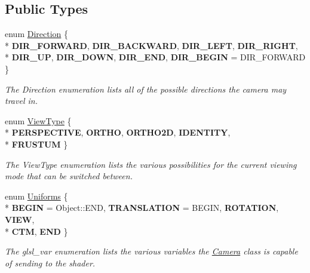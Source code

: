 \subsection*{Public Types}
\begin{DoxyCompactItemize}
\item 
enum \hyperlink{class_camera_a80cb65605322d27ad3b6d973484509ec}{Direction} \{ \\*
{\bfseries D\-I\-R\-\_\-\-F\-O\-R\-W\-A\-R\-D}, 
{\bfseries D\-I\-R\-\_\-\-B\-A\-C\-K\-W\-A\-R\-D}, 
{\bfseries D\-I\-R\-\_\-\-L\-E\-F\-T}, 
{\bfseries D\-I\-R\-\_\-\-R\-I\-G\-H\-T}, 
\\*
{\bfseries D\-I\-R\-\_\-\-U\-P}, 
{\bfseries D\-I\-R\-\_\-\-D\-O\-W\-N}, 
{\bfseries D\-I\-R\-\_\-\-E\-N\-D}, 
{\bfseries D\-I\-R\-\_\-\-B\-E\-G\-I\-N} =  D\-I\-R\-\_\-\-F\-O\-R\-W\-A\-R\-D
 \}
\begin{DoxyCompactList}\small\item\em The Direction enumeration lists all of the possible directions the camera may travel in. \end{DoxyCompactList}\item 
enum \hyperlink{class_camera_aaa256acd50a2fa143d9f8d9456e2802f}{View\-Type} \{ \\*
{\bfseries P\-E\-R\-S\-P\-E\-C\-T\-I\-V\-E}, 
{\bfseries O\-R\-T\-H\-O}, 
{\bfseries O\-R\-T\-H\-O2\-D}, 
{\bfseries I\-D\-E\-N\-T\-I\-T\-Y}, 
\\*
{\bfseries F\-R\-U\-S\-T\-U\-M}
 \}
\begin{DoxyCompactList}\small\item\em The View\-Type enumeration lists the various possibilities for the current viewing mode that can be switched between. \end{DoxyCompactList}\item 
enum \hyperlink{class_camera_a630738fd23098d44c0d15ee28d5649dd}{Uniforms} \{ \\*
{\bfseries B\-E\-G\-I\-N} =  Object\-:\-:E\-N\-D, 
{\bfseries T\-R\-A\-N\-S\-L\-A\-T\-I\-O\-N} =  B\-E\-G\-I\-N, 
{\bfseries R\-O\-T\-A\-T\-I\-O\-N}, 
{\bfseries V\-I\-E\-W}, 
\\*
{\bfseries C\-T\-M}, 
{\bfseries E\-N\-D}
 \}
\begin{DoxyCompactList}\small\item\em The glsl\-\_\-var enumeration lists the various variables the \hyperlink{class_camera}{Camera} class is capable of sending to the shader. \end{DoxyCompactList}\item 

\end{DoxyCompactItemize}

